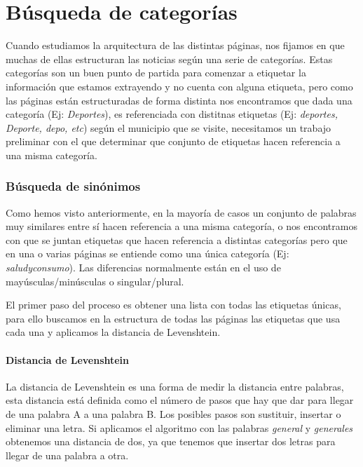\chapter{Búsqueda de categorías}
\label{chap:categorias}

Cuando estudiamos la arquitectura de las distintas páginas, nos fijamos en que muchas de ellas estructuran las noticias según una serie de categorías. Estas categorías son un buen punto de partida para comenzar a etiquetar la información que estamos extrayendo y no cuenta con alguna etiqueta, pero como las páginas están estructuradas de forma distinta nos encontramos que dada una categoría (Ej: \textit{Deportes}), es referenciada con distitnas etiquetas (Ej: \textit{deportes, Deporte, depo, etc})  según el municipio que se visite, necesitamos un trabajo preliminar con el que  determinar que conjunto de etiquetas hacen referencia a una misma categoría.

\subsection{Búsqueda de sinónimos}

Como hemos visto anteriormente, en la mayoría de casos un conjunto de palabras muy similares entre sí hacen referencia a una misma categoría, o nos encontramos con que se juntan etiquetas que hacen referencia a distintas categorías pero que en una o varias páginas se entiende como una única categoría (Ej: \textit{saludyconsumo}). Las diferencias normalmente están en el uso de mayúsculas/minúsculas o singular/plural.

El primer paso del proceso es obtener una lista con todas las etiquetas únicas, para ello buscamos en la estructura de todas las páginas las etiquetas que usa cada una y aplicamos la distancia de Levenshtein.

\subsubsection{Distancia de Levenshtein}

La distancia de Levenshtein es una forma de medir la distancia entre palabras, esta distancia está definida como el número de pasos que hay que dar para llegar de una palabra A a una palabra B. Los posibles pasos son sustituir, insertar o eliminar una letra.
Si aplicamos el algoritmo con las palabras \textit{general} y \textit{generales} obtenemos una distancia de dos, ya que tenemos que insertar dos letras para llegar de una palabra a otra.

